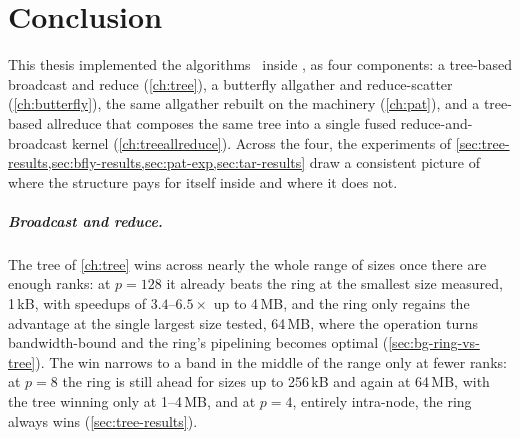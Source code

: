 \chapter{Conclusion}\label{ch:conclusion}

This thesis implemented the \bine{} algorithms~\cite{desensi2025bine} inside \nccl{}, as four components: a tree-based broadcast and reduce (\cref{ch:tree}), a butterfly allgather and reduce-scatter (\cref{ch:butterfly}), the same allgather rebuilt on the \pat{} machinery (\cref{ch:pat}), and a tree-based allreduce that composes the same \bine{} tree into a single fused reduce-and-broadcast kernel (\cref{ch:treeallreduce}).
Across the four, the experiments of \cref{sec:tree-results,sec:bfly-results,sec:pat-exp,sec:tar-results} draw a consistent picture of where the \bine{} structure pays for itself inside \nccl{} and where it does not.

\paragraph{Broadcast and reduce.}
The tree of \cref{ch:tree} wins across nearly the whole range of sizes once there are enough ranks: at $p=128$ it already beats the ring at the smallest size measured, 1\,kB, with speedups of $3.4$--$6.5\times$ up to 4\,MB, and the ring only regains the advantage at the single largest size tested, 64\,MB, where the operation turns bandwidth-bound and the ring's pipelining becomes optimal (\cref{sec:bg-ring-vs-tree}).
The win narrows to a band in the middle of the range only at fewer ranks: at $p=8$ the ring is still ahead for sizes up to 256\,kB and again at 64\,MB, with the tree winning only at 1--4\,MB, and at $p=4$, entirely intra-node, the ring always wins (\cref{sec:tree-results}).

